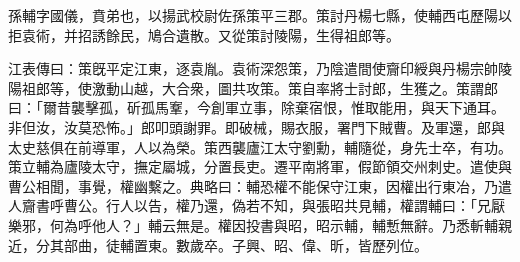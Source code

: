 
\begin{pinyinscope}
孫輔字國儀，賁弟也，以揚武校尉佐孫策平三郡。策討丹楊七縣，使輔西屯歷陽以拒袁術，并招誘餘民，鳩合遺散。又從策討陵陽，生得祖郎等。

江表傳曰：策旣平定江東，逐袁胤。袁術深怨策，乃陰遣間使齎印綬與丹楊宗帥陵陽祖郎等，使激動山越，大合衆，圖共攻策。策自率將士討郎，生獲之。策謂郎曰：「爾昔襲擊孤，斫孤馬鞌，今創軍立事，除棄宿恨，惟取能用，與天下通耳。非但汝，汝莫恐怖。」郎叩頭謝罪。即破械，賜衣服，署門下賊曹。及軍還，郎與太史慈俱在前導軍，人以為榮。策西襲廬江太守劉勳，輔隨從，身先士卒，有功。策立輔為廬陵太守，撫定屬城，分置長吏。遷平南將軍，假節領交州刺史。遣使與曹公相聞，事覺，權幽繫之。典略曰：輔恐權不能保守江東，因權出行東冶，乃遣人齎書呼曹公。行人以告，權乃還，偽若不知，與張昭共見輔，權謂輔曰：「兄厭樂邪，何為呼他人？」輔云無是。權因投書與昭，昭示輔，輔慙無辭。乃悉斬輔親近，分其部曲，徒輔置東。數歲卒。子興、昭、偉、昕，皆歷列位。


\end{pinyinscope}